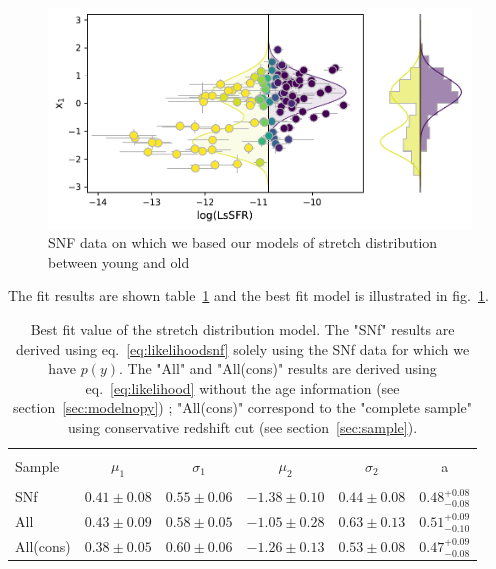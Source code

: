 \documentclass[]{aa} %
\begin{document}
\begin{figure}
    \label{fig:stretchlssfr}
    \centering
      \includegraphics[width=\linewidth]{Article_figures/BiGaussian_hist.pdf}
    \caption{SNF data on which we based our models of stretch distribution
    between young and old}
\end{figure}

The fit results are shown table~\ref{tab:modelresults} and the best fit model is
illustrated in fig.~\ref{fig:stretchlssfr}.

\begin{table}
    \centering
    \caption{Best fit value of the stretch distribution model. The "SNf" results
    are derived using eq.~\ref{eq:likelihoodsnf} solely using the SNf data for
which we have $p(y)$. The "All" and "All(cons)" results are derived using
eq.~\ref{eq:likelihood} without the age information (see
section~\ref{sec:modelnopy}) ; "All(cons)" correspond to the "complete sample"
using conservative redshift cut (see section~\ref{sec:sample}).}
    \label{tab:modelresults}
    \begin{tabular}{l c c c c c}
    \hline\hline\\[-0.8em]
        Sample & $\mu_1$  & $\sigma_1$ &$\mu_2$  & $\sigma_2$ & a \\[0.15em]
        \hline\\[-0.8em]
        SNf & $0.41 \pm 0.08$ & $0.55 \pm 0.06$ & $-1.38 \pm 0.10$ &
        $0.44 \pm 0.08$ & $0.48^{+0.08}_{-0.08}$ \\[0.15em]
        All & $0.43 \pm 0.09$ & $0.58 \pm 0.05$ & $-1.05 \pm 0.28$ &
        $0.63 \pm 0.13$ & $0.51^{+0.09}_{-0.10}$ \\[0.15em]
        All(cons) & $0.38 \pm 0.05$ & $0.60 \pm 0.06$ & $-1.26 \pm 0.13$
                  & $0.53 \pm 0.08$ & $0.47^{+0.09}_{-0.08}$ \\[0.15em]
        \hline
    \end{tabular}
\end{table}
\end{document}
